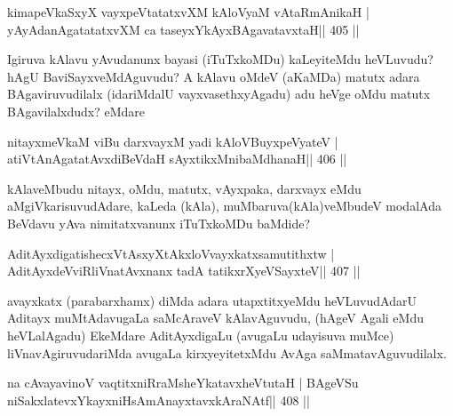 
\begin{shl}
kimapeVkaSxyX vayxpeVtatatxvXM kAloV\s yaM vAtaRmAnikaH |
yAyAdanAgatatatxvXM ca taseyxYkAyxBAgavatavxtaH\hfill || 405 ||
\end{shl}

\begin{artha}
Igiruva kAlavu yAvudanunx bayasi (iTuTxkoMDu) kaLeyiteMdu heVLuvudu? hAgU BaviSayxveMdAguvudu? A kAlavu oMdeV (aKaMDa) matutx adara BAgaviruvudilalx (idariMdalU vayxvasethxyAgadu) adu heVge oMdu matutx BAgavilalxdudx? eMdare
\end{artha}

\begin{shl}
nitayxmeVkaM viBu darxvayxM yadi kAloV\s BuyxpeVyateV |
atiVtAnAgatatAvxdiBeVdaH sAyxtikxMnibaMdhanaH\hfill || 406 ||
\end{shl}

\begin{artha}
kAlaveMbudu nitayx, oMdu, matutx, vAyxpaka, darxvayx eMdu aMgiVkarisuvudAdare, kaLeda (kAla), muMbaruva(kAla)veMbudeV modalAda BeVdavu yAva nimitatxvanunx iTuTxkoMDu baMdide?
\end{artha}

\begin{shl}
AditAyxdigatishecxVtAsxyXtAkxloV\s vayxkatxsamutithxtw |
AditAyxdeVviRliVnatAvxnanx tadA tatikxrXyeVSayxteV\hfill || 407 ||
\end{shl}

\begin{artha}
avayxkatx (parabarxhamx) diMda adara utapxtitxyeMdu heVLuvudAdarU Aditayx \break 	muMtAdavugaLa saMcAraveV kAlavAguvudu, (hAgeV Agali eMdu heVLalAgadu) EkeMdare AditAyxdigaLu (avugaLu udayisuva muMce) liVnavAgiruvudariMda avugaLa kirxyeyitetxMdu AvAga saMmatavAguvudilalx.
\end{artha}


\begin{shl}
na cAvayavinoV vaqtitxniRraMsheYkatavxheVtutaH |
BAgeVSu niSakxlatevxYkayxniHsAmAnayxtavxkAraNAtf\hfill || 408 ||
\end{shl}

